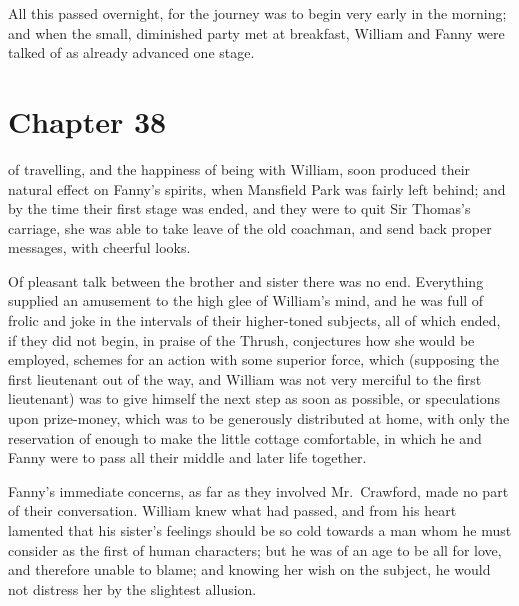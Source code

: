 All this passed overnight, for the journey was to
begin very early in the morning; and when the small,
diminished party met at breakfast, William and Fanny
were talked of as already advanced one stage.



\chapter{Chapter 38}

 of travelling, and the happiness of being
with William, soon produced their natural effect on
Fanny's spirits, when Mansfield Park was fairly left behind;
and by the time their first stage was ended, and they
were to quit Sir Thomas's carriage, she was able to take
leave of the old coachman, and send back proper messages,
with cheerful looks.

Of pleasant talk between the brother and sister there
was no end.  Everything supplied an amusement to the high
glee of William's mind, and he was full of frolic and
joke in the intervals of their higher-toned subjects,
all of which ended, if they did not begin, in praise
of the Thrush, conjectures how she would be employed,
schemes for an action with some superior force,
which (supposing the first lieutenant out of the way,
and William was not very merciful to the first lieutenant)
was to give himself the next step as soon as possible,
or speculations upon prize-money, which was to be generously
distributed at home, with only the reservation of enough
to make the little cottage comfortable, in which he and Fanny
were to pass all their middle and later life together.

Fanny's immediate concerns, as far as they involved
Mr.\ Crawford, made no part of their conversation.
William knew what had passed, and from his heart lamented
that his sister's feelings should be so cold towards a man
whom he must consider as the first of human characters;
but he was of an age to be all for love, and therefore
unable to blame; and knowing her wish on the subject,
he would not distress her by the slightest allusion.

